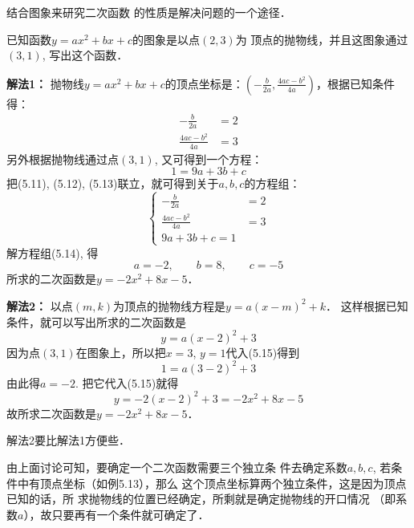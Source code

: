 结合图象来研究二次函数
的性质是解决问题的一个途径．

\begin{example}
    已知函数$y=ax^2+bx+c$的图象是以点$(2,3)$为
顶点的抛物线，并且这图象通过$(3,1)$, 写出这个函数．
\end{example}

\begin{solution}
\textbf{解法1：} 抛物线$y=ax^2+bx+c$的顶点坐标是：$\left(-\frac{b}{2a},\frac{4ac-b^2}{4a}\right)$，根据已知条件得：
\begin{align}
    -\frac{b}{2a}&=2\\
\frac{4ac-b^2}{4a}&=3
\end{align}
另外根据抛物线通过点$(3,1)$, 又可得到一个方程：
\begin{equation}
    1=9a+3b+c
\end{equation}
把(5.11), (5.12), (5.13)联立，就可得到关于$a,b,c$的方程组：
\begin{equation}
    \begin{cases}
        -\frac{b}{2a}&=2\\
\frac{4ac-b^2}{4a}&=3\\
9a+3b+c=1
    \end{cases}
\end{equation}
解方程组(5.14), 得
\[a=-2,\qquad b=8,\qquad c=-5\]
所求的二次函数是$y=-2x^2+8x-5$．

\textbf{解法2：} 以点$(m,k)$为顶点的抛物线方程是$y=a(x-m)^2+k$．
这样根据已知条件，就可以写出所求的二次函数是
\begin{equation}
    y=a(x-2)^2+3
\end{equation}
因为点$(3,1)$在图象上，所以把$x=3$, $y=1$代入(5.15)得到
\[1=a(3-2)^2+3\]
由此得$a=-2$. 把它代入(5.15)就得
\[y=-2(x-2)^2+3=-2x^2+8x-5\]
故所求二次函数是$y=-2x^2+8x-5$．

解法2要比解法1方便些．
\end{solution}

由上面讨论可知，要确定一个二次函数需要三个独立条
件去确定系数$a,b,c$, 若条件中有顶点坐标（如例5.13），那么
这个顶点坐标算两个独立条件，这是因为顶点已知的话，所
求抛物线的位置已经确定，所剩就是确定抛物线的开口情况
（即系数$a$），故只要再有一个条件就可确定了．

